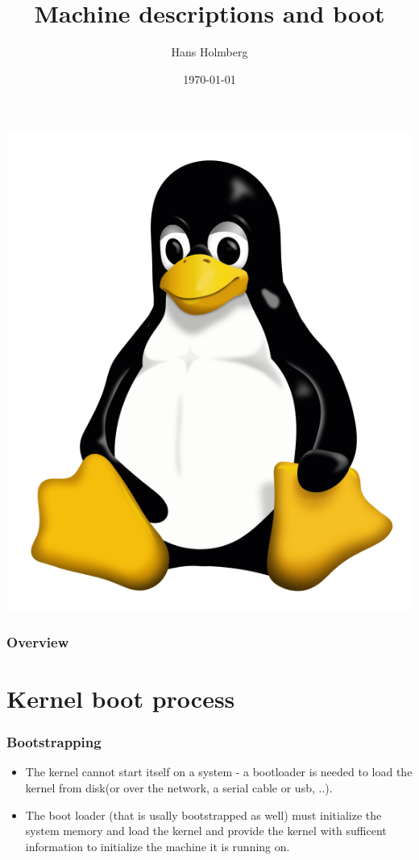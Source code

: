 \documentclass{beamer}
\title[TLKDCC Machine descriptions and boot]{Machine descriptions and boot}
\author{Hans Holmberg}
\institute[LKTP]
{
Linux Kernel Teaching Project \\ 
\medskip
\textit{hans.holmberg@gmail.com}
}
\date{\today}
\begin{document}
\begin{frame}
\titlepage
\includegraphics{tux} 
\end{frame}

\begin{frame}
\frametitle{Overview}
\tableofcontents 
\end{frame}

\section{Kernel boot process}

\begin{frame}
\frametitle{Bootstrapping}
\begin{itemize}
	\item The kernel cannot start itself on a system - a bootloader is needed to load the kernel from disk(or over the network,  a serial cable or usb, ..).
	\item The boot loader (that is usally bootstrapped as well) must initialize the system memory and load the kernel and provide the kernel with sufficent information to initialize the machine it is running on.
\end{itemize}
\end{frame}
\end{document}
